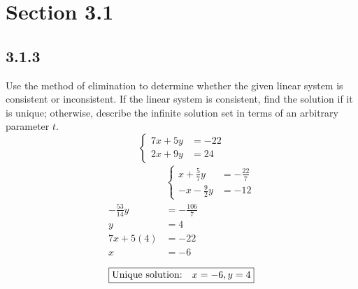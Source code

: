 \documentclass{article}
\begin{document}
\newcommand{\hr}{\par\noindent\rule{\textwidth}{0.4pt}}

\newcommand{\bc}[1]{
	\begin{equation*}
		\begin{boxed}
			{#1}
		\end{boxed}
	\end{equation*}
}

\newcommand{\cond}[2]{
	\ifmmode
		{#1} \quad {#2}
	\else
		$$ {#1} \quad {#2} $$
	\fi
}

\tableofcontents

\section{Section 3.1}

\subsection{3.1.3}
Use the method of elimination to determine whether the given linear system is consistent or inconsistent. If the linear system is consistent, find the solution if it is unique; otherwise, describe the infinite solution set in terms of an arbitrary parameter $ t $.
\begin{equation*}
	\left\{
		\begin{aligned}
			7x + 5y & = -22 \\
			2x + 9y & = 24
		\end{aligned}
	\right.
\end{equation*}
\begin{align*}
	& \left\{
		\begin{aligned}
			x + \frac{5}{7}y & = -\frac{22}{7} \\
			-x - \frac{9}{2}y & = -12
		\end{aligned}
	\right. \\
	-\frac{53}{14}y & = -\frac{106}{7} \\
	y & = 4 \\
	7x + 5(4) & = -22 \\
	x & = -6
\end{align*}
\bc{\text{Unique solution:} \quad x = -6, y = 4}
\end{document}
